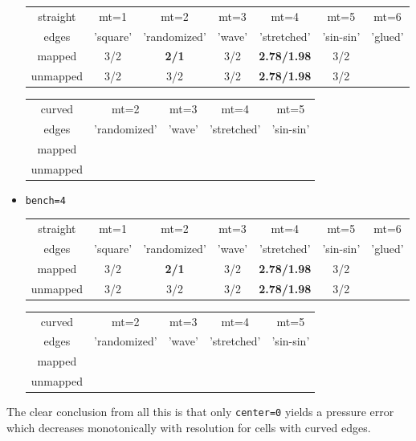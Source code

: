 \begin{itemize}
\begin{tabular}{c|cccccc}
\hline
straight& mt=1     &  mt=2        &  mt=3  &  mt=4       & mt=5  & mt=6\\
edges& 'square' & 'randomized' & 'wave' & 'stretched' & 'sin-sin' & 'glued'\\
\hline
mapped   & 3/2 & {\bf 2/1} &3/2 & {\bf 2.78/1.98}  &3/2 \\
unmapped & 3/2 &3/2 &3/2 & {\bf 2.78/1.98} &3/2 \\
\hline
\end{tabular}


\begin{tabular}{c|cccc}
\hline
curved&  mt=2        &  mt=3  &  mt=4       & mt=5 \\
edges& 'randomized' & 'wave' & 'stretched' & 'sin-sin' \\
\hline
mapped   & \\ 
unmapped &  \\
\hline
\end{tabular}

\item {\tt bench=4}

\begin{tabular}{c|cccccc}
\hline
straight& mt=1     &  mt=2        &  mt=3  &  mt=4       & mt=5  & mt=6\\
edges& 'square' & 'randomized' & 'wave' & 'stretched' & 'sin-sin' & 'glued'\\
\hline
mapped   & 3/2 & {\bf 2/1} &3/2 & {\bf 2.78/1.98}  &3/2 \\
unmapped & 3/2 &3/2 &3/2 & {\bf 2.78/1.98} &3/2 \\
\hline
\end{tabular}

\begin{tabular}{c|cccc}
\hline
curved&  mt=2        &  mt=3  &  mt=4       & mt=5 \\
edges& 'randomized' & 'wave' & 'stretched' & 'sin-sin' \\
\hline
mapped   & \\ 
unmapped &  \\
\hline
\end{tabular}

\end{itemize}

The clear conclusion from all this is that only \lstinline{center=0}
yields a pressure error which decreases monotonically with resolution 
for cells with curved edges. 

